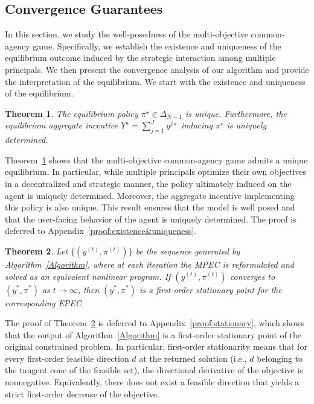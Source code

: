 \documentclass{article}
\newtheorem{theorem}{Theorem}
\begin{document}
\subsection{Convergence Guarantees}\label{sec:convergence}

In this section, we study the well-posedness of the multi-objective common-agency game. Specifically, we establish the existence and uniqueness of the equilibrium outcome induced by the strategic interaction among multiple principals. We then present the convergence analysis of our algorithm and provide the interpretation of the equilibrium. We start with the existence and uniqueness of the equilibrium.

\begin{theorem}
\label{thm:existence&uniqueness}
The equilibrium policy $\pi^\star \in \Delta_{N-1}$ is unique. Furthermore, the equilibrium aggregate incentive $Y^\star = \sum_{j=1}^J y^{j\star}$ inducing $\pi^\star$ is uniquely determined.
\end{theorem}

Theorem~\ref{thm:existence&uniqueness} shows that the multi-objective common-agency game admits a unique equilibrium. In particular, while multiple principals optimize their own objectives in a decentralized and strategic manner, the policy ultimately induced on the agent is uniquely determined. Moreover, the aggregate incentive implementing this policy is also unique. This result ensures that the model is well posed and that the user-facing behavior of the agent is uniquely determined. The proof is deferred to Appendix~\ref{proof:existence&uniqueness}.

\begin{theorem}\label{thm:diag-b-stationary}
Let $\{(y^{(t)},\pi^{(t)})\}$ be the sequence generated by Algorithm~\ref{Algorithm}, where at each iteration the MPEC is reformulated and solved as an equivalent nonlinear program. If $(y^{(t)},\pi^{(t)})$ converges to $ (y^*,\pi^*)$ as $t\to\infty$, then $(y^*,\pi^*)$ is a first-order stationary point for the corresponding EPEC.
\end{theorem}

The proof of Theorem~\ref{thm:diag-b-stationary} is deferred to
Appendix~\ref{proof:stationary}, which shows that the output of
Algorithm~\ref{Algorithm} is a first-order stationary point of the original constrained problem.
In particular, first-order stationarity means that for every first-order feasible direction $d$ at the returned solution (i.e., $d$ belonging to the tangent cone of the feasible set), the directional derivative of the objective is nonnegative.
Equivalently, there does not exist a feasible direction that yields a strict first-order decrease of the objective.
\end{document}
